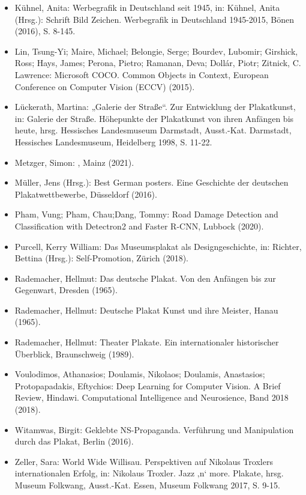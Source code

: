 \documentclass[a4paper,12pt,ngerman]{article}
\begin{document}
\begin{itemize}
	\item Kühnel, Anita: Werbegrafik in Deutschland seit 1945, in: Kühnel, Anita (Hrsg.): Schrift Bild Zeichen. Werbegrafik in Deutschland 1945-2015, Bönen (2016), S. 8-145.
	\item Lin, Tsung-Yi; Maire, Michael; Belongie, Serge; Bourdev, Lubomir; Girshick, Ross; Hays, James; Perona, Pietro; Ramanan, Deva; Dollár, Piotr; Zitnick, C. Lawrence: Microsoft COCO. Common Objects in Context, European Conference on Computer Vision (ECCV) (2015).
	\item Lückerath, Martina: „Galerie der Straße“. Zur Entwicklung der Plakatkunst, in: Galerie der Straße. Höhepunkte der Plakatkunst von ihren Anfängen bis heute, hrsg. Hessisches Landesmuseum Darmstadt, Ausst.-Kat. Darmstadt, Hessisches Landesmuseum, Heidelberg 1998, S. 11-22.
	\item Metzger, Simon: , Mainz (2021).
	\item Müller, Jens (Hrsg.): Best German posters. Eine Geschichte der deutschen Plakatwettbewerbe, Düsseldorf (2016).
	\item Pham, Vung; Pham, Chau;Dang, Tommy: Road Damage Detection and Classification with Detectron2 and Faster R-CNN, Lubbock (2020). 
	\item Purcell, Kerry William: Das Museumsplakat als Designgeschichte, in: Richter, Bettina (Hrsg.): Self-Promotion, Zürich (2018).
	\item Rademacher, Hellmut: Das deutsche Plakat. Von den Anfängen bis zur Gegenwart, Dresden (1965).
	\item Rademacher, Hellmut: Deutsche Plakat Kunst und ihre Meister, Hanau (1965).
	\item Rademacher, Hellmut: Theater Plakate. Ein internationaler historischer Überblick, Braunschweig (1989).
	\item Voulodimos, Athanasios; Doulamis, Nikolaos; Doulamis, Anastasios; Protopapadakis, Eftychios: Deep Learning for Computer Vision. A Brief Review, Hindawi. Computational Intelligence and Neurosience, Band 2018 (2018). 
	\item Witamwas, Birgit: Geklebte NS-Propaganda. Verführung und Manipulation durch das Plakat, Berlin (2016).
	\item Zeller, Sara: World Wide Willisau. Perspektiven auf Nikolaus Troxlers internationalen Erfolg, in: Nikolaus Troxler. Jazz ‚n‘ more. Plakate, hrsg. Museum Folkwang, Ausst.-Kat. Essen, Museum Folkwang 2017, S. 9-15.

\end{itemize}
\end{document}
